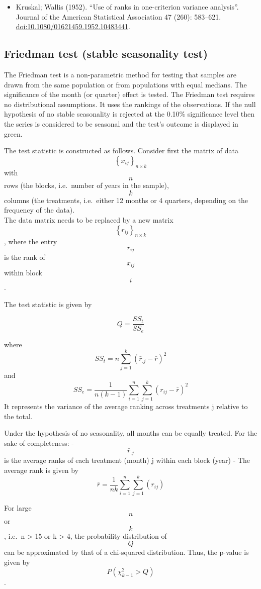 \documentclass[
]{book}
\providecommand{\tightlist}{%
  \setlength{\itemsep}{0pt}\setlength{\parskip}{0pt}}
\begin{document}
\begin{itemize}
\tightlist
\item
  Kruskal; Wallis (1952). ``Use of ranks in one-criterion variance analysis''. Journal of the American Statistical Association 47 (260): 583--621. \url{doi:10.1080/01621459.1952.10483441}.
\end{itemize}

\hypertarget{friedman-test-stable-seasonality-test}{%
\subsection{Friedman test (stable seasonality test)}\label{friedman-test-stable-seasonality-test}}

The Friedman test is a non-parametric method for testing that samples are drawn from the same population or from populations with equal medians.
The significance of the month (or quarter) effect is tested. The Friedman test requires no distributional assumptions. It uses the rankings of the observations.
If the null hypothesis of no stable seasonality is rejected at the 0.10\% significance level then the series is considered to be seasonal
and the test's outcome is displayed in green.

The test statistic is constructed as follows. Consider first the matrix of data \[ \left\{x_{ij}\right\}_{n \times k} \] with \[ n \] rows (the blocks,
i.e.~number of years in the sample), \[ k \] columns (the treatments, i.e.~either 12 months or 4 quarters, depending on the frequency of the data).\\
The data matrix needs to be replaced by a new matrix \[ \left\{r_{ij}\right\}_{n \times k} \], where the entry \[ r_{ij} \] is the rank of \[ x_{ij} \]
within block \[ i \] .

The test statistic is given by

\[
Q=\frac{SS_t}{SS_e}
\]

where \[ SS_t=n \sum_{j=1}^{k}(\bar{r}_{.j}-\bar{r})^2 \] and \[ SS_e=\frac{1}{n(k-1)} \sum_{i=1}^{n}\sum_{j=1}^{k}(r_{ij}-\bar{r})^2 \]
It represents the variance of the average ranking across treatments j relative to the total.

Under the hypothesis of no seasonality, all months can be equally treated. For the sake of completeness:
- \[ \bar{r}_{.j} \] is the average ranks of each treatment (month) j within each block (year)
- The average rank is given by \[ \bar{r}= \frac{1}{nk}\sum_{i=1}^{n}\sum_{j=1}^{k}(r_{ij})\]

For large \[ n \] or \[ k \] , i.e.~n \textgreater{} 15 or k \textgreater{} 4, the probability distribution of \[ Q \] can be approximated by that of
a chi-squared distribution. Thus, the p-value is given by \[ P( \chi^2_{k-1}>Q) \] .
\end{document}
